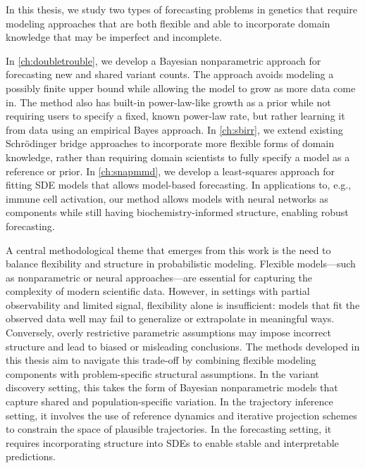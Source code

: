 In this thesis, we study two types of forecasting problems in genetics that require modeling approaches that are both flexible and able to incorporate domain knowledge that may be imperfect and incomplete.

In \cref{ch:doubletrouble}, we develop a Bayesian nonparametric approach for forecasting new and shared variant counts. The approach avoids modeling a possibly finite upper bound while allowing the model to grow as more data come in. The method also has built-in power-law-like growth as a prior while not requiring users to specify a fixed, known power-law rate, but rather learning it from data using an empirical Bayes approach. In \cref{ch:sbirr}, we extend existing Schrödinger bridge approaches to incorporate more flexible forms of domain knowledge, rather than requiring domain scientists to fully specify a model as a reference or prior. In \cref{ch:snapmmd}, we develop a least-squares approach for fitting SDE models that allows model-based forecasting. In applications to, e.g., immune cell activation, our method allows models with neural networks as components while still having biochemistry-informed structure, enabling robust forecasting.

A central methodological theme that emerges from this work is the need to balance flexibility and structure in probabilistic modeling. Flexible models---such as nonparametric or neural approaches---are essential for capturing the complexity of modern scientific data. However, in settings with partial observability and limited signal, flexibility alone is insufficient: models that fit the observed data well may fail to generalize or extrapolate in meaningful ways. Conversely, overly restrictive parametric assumptions may impose incorrect structure and lead to biased or misleading conclusions. The methods developed in this thesis aim to navigate this trade-off by combining flexible modeling components with problem-specific structural assumptions. In the variant discovery setting, this takes the form of Bayesian nonparametric models that capture shared and population-specific variation. In the trajectory inference setting, it involves the use of reference dynamics and iterative projection schemes to constrain the space of plausible trajectories. In the forecasting setting, it requires incorporating structure into SDEs to enable stable and interpretable predictions.

